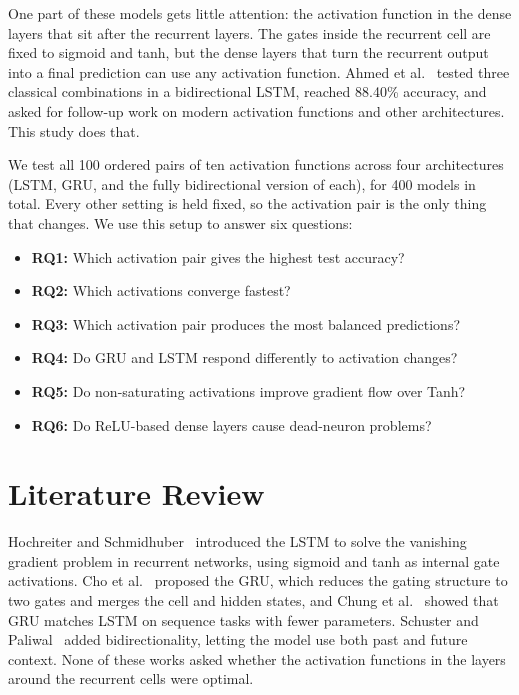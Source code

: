 \documentclass[conference]{IEEEtran}
\begin{document}
One part of these models gets little attention: the activation
function in the dense layers that sit after the recurrent
layers. The gates inside the recurrent cell are fixed to
sigmoid and tanh, but the dense layers that turn the recurrent
output into a final prediction can use any activation function.
Ahmed et al.~\cite{ahmed2025} tested three classical
combinations in a bidirectional LSTM, reached 88.40\% accuracy,
and asked for follow-up work on modern activation functions and
other architectures. This study does that.

We test all 100 ordered pairs of ten activation functions
across four architectures (LSTM, GRU, and the fully
bidirectional version of each), for 400 models in total. Every
other setting is held fixed, so the activation pair is the only
thing that changes. We use this setup to answer six questions:

\begin{itemize}
  \item \textbf{RQ1:} Which activation pair gives the highest test accuracy?
  \item \textbf{RQ2:} Which activations converge fastest?
  \item \textbf{RQ3:} Which activation pair produces the most balanced predictions?
  \item \textbf{RQ4:} Do GRU and LSTM respond differently to activation changes?
  \item \textbf{RQ5:} Do non-saturating activations improve gradient flow over Tanh?
  \item \textbf{RQ6:} Do ReLU-based dense layers cause dead-neuron problems?
\end{itemize}

\FloatBarrier
\section{Literature Review}

Hochreiter and Schmidhuber~\cite{hochreiter1997} introduced
the LSTM to solve the vanishing gradient problem in recurrent
networks, using sigmoid and tanh as internal gate activations.
Cho et al.~\cite{cho2014} proposed the GRU, which reduces the gating
structure to two gates and merges the cell and hidden states, and Chung
et al.~\cite{chung2014} showed that GRU matches LSTM on sequence
tasks with fewer parameters. Schuster and Paliwal~\cite{schuster1997}
added bidirectionality, letting the model use both past and future
context. None of these works asked whether the activation
functions in the layers around the recurrent cells were optimal.
\end{document}
